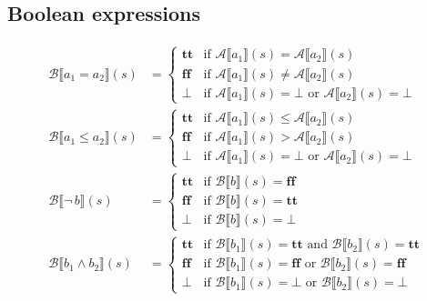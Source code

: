 \documentclass[11pt,oneside,a4paper]{article}
\begin{document}
\subsection*{Boolean expressions}
\begin{align*} 
\mathcal{B}\llbracket a_1 = a_ 2 \rrbracket(s) &=
    \begin{cases}
        \textbf{tt} & \text{if } \mathcal{A}\llbracket a_1 \rrbracket(s) =
        \mathcal{A}\llbracket a_2 \rrbracket(s) \\
        \textbf{ff} & \text{if } \mathcal{A}\llbracket a_1 \rrbracket(s) \neq
        \mathcal{A}\llbracket a_2 \rrbracket(s)  \\
        \bot & \text{if } \mathcal{A}\llbracket a_1 \rrbracket(s) = \bot
                          \text{ or }
                          \mathcal{A} \llbracket a_2 \rrbracket (s) = \bot
    \end{cases} \\
\mathcal{B}\llbracket a_1 \leq a_2 \rrbracket(s) &= 
    \begin{cases}
        \textbf{tt} & \text{if } \mathcal{A}\llbracket a_1 \rrbracket(s) \leq
        \mathcal{A}\llbracket a_2 \rrbracket(s) \\
        \textbf{ff} & \text{if } \mathcal{A}\llbracket a_1 \rrbracket(s) >
        \mathcal{A}\llbracket a_2 \rrbracket(s)  \\
        \bot & \text{if } \mathcal{A}\llbracket a_1 \rrbracket(s) = \bot 
                          \text{ or }
                          \mathcal{A} \llbracket a_2 \rrbracket (s) = \bot
    \end{cases} \\
\mathcal{B}\llbracket \neg\, b \rrbracket(s) &= 
    \begin{cases}
        \textbf{tt} & \text{if } \mathcal{B}\llbracket b \rrbracket(s) =
        \textbf{ff} \\
        \textbf{ff} & \text{if } \mathcal{B}\llbracket b \rrbracket(s) =
        \textbf{tt} \\
        \bot & \text{if }\mathcal{B}\llbracket b \rrbracket(s) = \bot
    \end{cases} \\
\mathcal{B}\llbracket b_1 \land b_2 \rrbracket(s) &= 
    \begin{cases}
        \textbf{tt} & \text{if } \mathcal{B}\llbracket b_1 \rrbracket(s) =
        \textbf{tt} \text{ and } \mathcal{B}\llbracket b_2 \rrbracket(s) =
        \textbf{tt} \\
        \textbf{ff} & \text{if } \mathcal{B}\llbracket b_1 \rrbracket(s) =
        \textbf{ff} \text{ or } \mathcal{B}\llbracket b_2 \rrbracket(s) =
        \textbf{ff} \\
        \bot & \text{if }\mathcal{B}\llbracket b_1 \rrbracket(s) = \bot
                         \text{ or }
                         \mathcal{B}\llbracket b_2 \rrbracket(s) = \bot
    \end{cases}
\end{align*}
\end{document}
